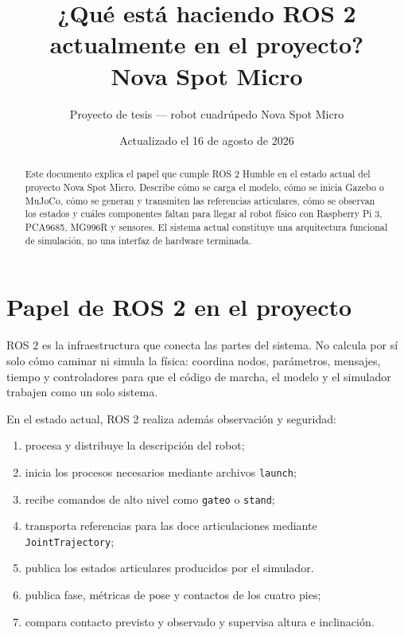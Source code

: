 \documentclass[11pt,a4paper]{article}
\title{¿Qué está haciendo ROS 2 actualmente en el proyecto?\\Nova Spot Micro}
\author{Proyecto de tesis --- robot cuadrúpedo Nova Spot Micro}
\date{Actualizado el 16 de agosto de 2026}
\begin{document}
\maketitle
\begin{abstract}
Este documento explica el papel que cumple ROS 2 Humble en el estado actual del
proyecto Nova Spot Micro. Describe cómo se carga el modelo, cómo se inicia
Gazebo o MuJoCo, cómo se generan y transmiten las referencias articulares, cómo
se observan los estados y cuáles componentes faltan para llegar al robot físico
con Raspberry Pi 3, PCA9685, MG996R y sensores. El sistema actual constituye
una arquitectura funcional de simulación, no una interfaz de hardware terminada.
\end{abstract}
\tableofcontents

\section{Papel de ROS 2 en el proyecto}
ROS 2 es la infraestructura que conecta las partes del sistema. No calcula por
sí solo cómo caminar ni simula la física: coordina nodos, parámetros, mensajes,
tiempo y controladores para que el código de marcha, el modelo y el simulador
trabajen como un solo sistema.

En el estado actual, ROS 2 realiza además observación y seguridad:
\begin{enumerate}
\item procesa y distribuye la descripción del robot;
\item inicia los procesos necesarios mediante archivos \texttt{launch};
\item recibe comandos de alto nivel como \texttt{gateo} o \texttt{stand};
\item transporta referencias para las doce articulaciones mediante
  \texttt{JointTrajectory};
\item publica los estados articulares producidos por el simulador.
\item publica fase, métricas de pose y contactos de los cuatro pies;
\item compara contacto previsto y observado y supervisa altura e inclinación.
\end{enumerate}
\end{document}
